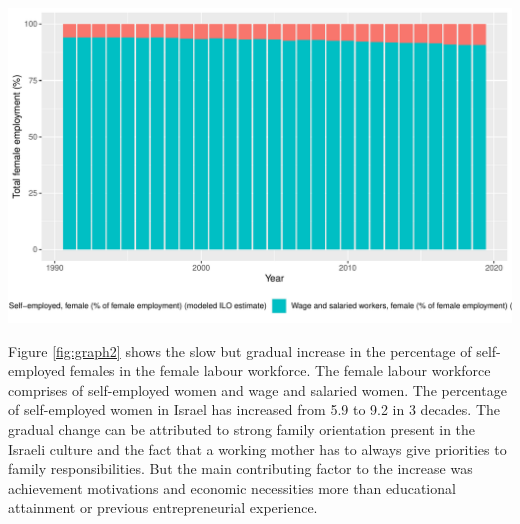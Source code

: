 \documentclass[11pt,a4paper,]{article}
\newenvironment{Shaded}{\begin{snugshade}}{\end{snugshade}}
\newcommand{\DataTypeTok}[1]{\textcolor[rgb]{0.13,0.29,0.53}{#1}}
\newcommand{\DecValTok}[1]{\textcolor[rgb]{0.00,0.00,0.81}{#1}}
\newcommand{\KeywordTok}[1]{\textcolor[rgb]{0.13,0.29,0.53}{\textbf{#1}}}
\newcommand{\NormalTok}[1]{#1}
\newcommand{\OperatorTok}[1]{\textcolor[rgb]{0.81,0.36,0.00}{\textbf{#1}}}
\newcommand{\StringTok}[1]{\textcolor[rgb]{0.31,0.60,0.02}{#1}}
\let\origfigure\figure
\let\endorigfigure\endfigure
\renewenvironment{figure}[1][2] {
    \expandafter\origfigure\expandafter[H]
} {
    \endorigfigure
}%
\begin{document}
\begin{Shaded}
\end{Shaded}

\begin{figure}
\centering
\includegraphics{report_files/figure-latex/graph2-1.pdf}
\caption{\label{fig:graph2}Self-employed v/s Wage \& salaried female workers}
\end{figure}

Figure \ref{fig:graph2} shows the slow but gradual increase in the percentage of self-employed females in the female labour workforce. The female labour workforce comprises of self-employed women and wage and salaried women. The percentage of self-employed women in Israel has increased from 5.9 to 9.2 in 3 decades. The gradual change can be attributed to strong family orientation present in the Israeli culture and the fact that a working mother has to always give priorities to family responsibilities. But the main contributing factor to the increase was achievement motivations and economic necessities more than educational attainment or previous entrepreneurial experience.
\end{document}
